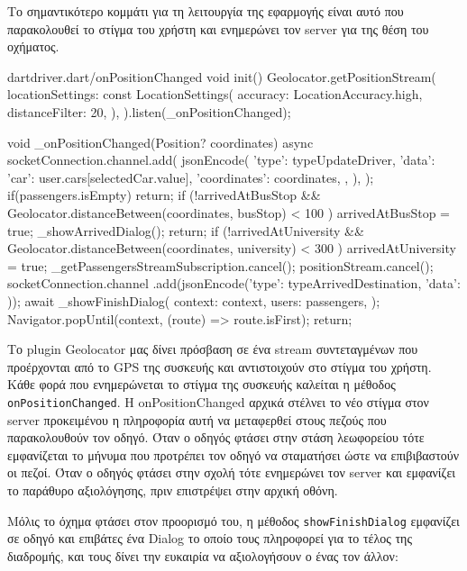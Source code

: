 \documentclass[../thesis.tex]{subfiles}
\begin{document}
Το σημαντικότερο κομμάτι για τη λειτουργία της εφαρμογής είναι αυτό που παρακολουθεί το στίγμα του χρήστη και ενημερώνει τον server για της θέση του οχήματος.

\begin{codeblock}{dart}{driver.dart/onPositionChanged}
  void init(){
    Geolocator.getPositionStream(
        locationSettings: const LocationSettings(
          accuracy: LocationAccuracy.high,
          distanceFilter: 20,
        ),
      ).listen(_onPositionChanged);
  }

  void _onPositionChanged(Position? coordinates) async {
    socketConnection.channel.add(
      jsonEncode({
        'type': typeUpdateDriver,
        'data': {
          'car': user.cars[selectedCar.value],
          'coordinates': coordinates,
        },
      }),
    );
    if(passengers.isEmpty) return;
    if (!arrivedAtBusStop &&
        Geolocator.distanceBetween(coordinates, busStop) < 100
        ) {
      arrivedAtBusStop = true;
      _showArrivedDialog();
      return;
    }
    if (!arrivedAtUniversity &&
        Geolocator.distanceBetween(coordinates, university) < 300
        ) {
      arrivedAtUniversity = true;
      _getPassengersStreamSubscription.cancel();
      positionStream.cancel();
      socketConnection.channel
          .add(jsonEncode({'type': typeArrivedDestination, 'data': {}}));
      await _showFinishDialog(
        context: context,
        users: passengers,
      );
      Navigator.popUntil(context, (route) => route.isFirst);
      return;
    }
  }
\end{codeblock}

Το plugin Geolocator μας δίνει πρόσβαση σε ένα stream συντεταγμένων που προέρχονται από το GPS της συσκευής και αντιστοιχούν στο στίγμα του χρήστη.
Κάθε φορά που ενημερώνεται το στίγμα της συσκευής καλείται η μέθοδος \verb|onPositionChanged|.
Η onPositionChanged αρχικά στέλνει το νέο στίγμα στον server προκειμένου η πληροφορία αυτή να μεταφερθεί στους πεζούς που παρακολουθούν τον οδηγό.
Όταν ο οδηγός φτάσει στην στάση λεωφορείου τότε εμφανίζεται το μήνυμα που προτρέπει τον οδηγό να σταματήσει ώστε να επιβιβαστούν οι πεζοί.
Όταν ο οδηγός φτάσει στην σχολή τότε ενημερώνει τον server και εμφανίζει το παράθυρο αξιολόγησης, πριν επιστρέψει στην αρχική οθόνη.

Μόλις το όχημα φτάσει στον προορισμό του, η μέθοδος \verb|showFinishDialog| εμφανίζει σε οδηγό και επιβάτες ένα Dialog το οποίο τους πληροφορεί για το τέλος της διαδρομής, και τους δίνει την ευκαιρία να αξιολογήσουν ο ένας τον άλλον:
\end{document}
